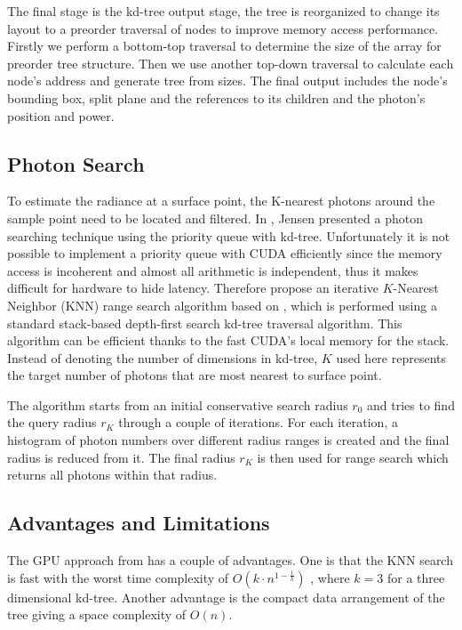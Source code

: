 The final stage is the kd-tree output stage, the tree is reorganized to change its layout to a preorder traversal of nodes to improve memory access performance. Firstly we perform a bottom-top traversal to determine the size of the array for preorder tree structure. Then we use another top-down traversal to calculate each node's address and generate tree from sizes. The final output includes the node's bounding box, split plane and the references to its children and the photon's position and power.

\subsection{Photon Search}
To estimate the radiance at a surface point, the K-nearest photons around the sample point need to be located and filtered. In \cite{HenrikWannJensen2004}, Jensen presented a photon searching technique using the priority queue with kd-tree. Unfortunately it is not possible to implement a priority queue with CUDA efficiently since the memory access is incoherent and almost all arithmetic is independent, thus it makes difficult for hardware to hide latency. Therefore \citeauthor{Zhou2008} propose an iterative $K$-Nearest Neighbor (KNN) range search algorithm based on \cite{Preparata:1985:CGI:4333}, which is performed using a standard stack-based depth-first search kd-tree traversal algorithm. This algorithm can be efficient thanks to the fast CUDA's local memory for the stack. Instead of denoting the number of dimensions in kd-tree, \(K\) used here represents the target number of photons that are most nearest to surface point.

The algorithm starts from an initial conservative search radius \(r_{0}\) and tries to find the query radius \(r_{K}\) through a couple of iterations. For each iteration, a histogram of photon numbers over different radius ranges is created and the final radius is reduced from it. The final radius \(r_{K}\) is then used for range search which returns all photons within that radius.


\subsection{Advantages and Limitations}
The GPU approach from \citeauthor{Zhou2008} has a couple of advantages. One is that the KNN search is fast with the worst time complexity of \(O(k\cdot n^{1-\frac{1}{k}})\) \cite{Lee1977}, where \(k = 3\) for a three dimensional kd-tree.
Another advantage is the compact data arrangement of the tree giving a space complexity of \(O(n)\).

